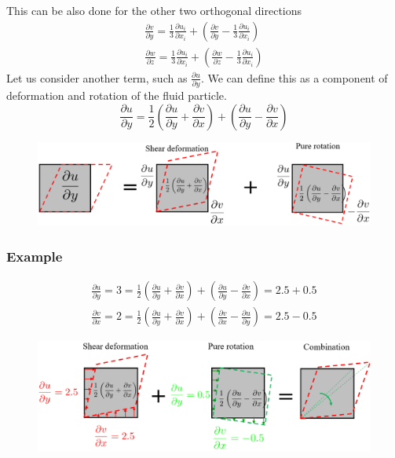 \documentclass[class=report, crop=false, 12pt,a4paper]{standalone}
\begin{document}
This can be also done for the other two orthogonal directions
\begin{gather}
  \frac{\partial v}{\partial y} = \frac{1}{3}\frac{\partial u_i}{\partial x_i} + \left( \frac{\partial v}{\partial y} - \frac{1}{3}\frac{\partial u_i}{\partial x_i} \right)\\
  \frac{\partial w}{\partial z} = \frac{1}{3}\frac{\partial u_i}{\partial x_i} + \left( \frac{\partial w}{\partial z} - \frac{1}{3}\frac{\partial u_i}{\partial x_i} \right)
\end{gather}
Let us consider another term, such as $\frac{\partial u}{\partial y}$. We can define this as a component of deformation and rotation of the fluid particle.
\begin{equation}
  \frac{\partial u}{\partial y}=\frac{1}{2} \left(\frac{\partial u}{\partial y} + \frac{\partial v}{\partial x}\right) + \left(\frac{\partial u}{\partial y} - \frac{\partial v}{\partial x}\right)
\end{equation}
\begin{figure}[H]
  \centering
  \includegraphics[width = \textwidth]{../img/diagram5.png}
\end{figure}
\subsubsection{Example}
\begin{gather}
  \frac{\partial u}{\partial y}=3=\frac{1}{2} \left(\frac{\partial u}{\partial y} + \frac{\partial v}{\partial x}\right) + \left(\frac{\partial u}{\partial y} - \frac{\partial v}{\partial x}\right) = 2.5 + 0.5\\
  \frac{\partial v}{\partial x}=2=\frac{1}{2} \left(\frac{\partial u}{\partial y} + \frac{\partial v}{\partial x}\right) + \left(\frac{\partial v}{\partial x} - \frac{\partial u}{\partial y}\right) = 2.5 - 0.5
\end{gather}
\begin{figure}[H]
  \centering
  \includegraphics[width = \textwidth]{../img/diagram6.png}
\end{figure}
\end{document}
